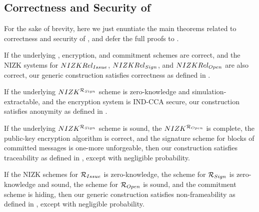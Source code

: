 \subsection{Correctness and Security of \GSACGen}
\label{ssec:security-gsac}

For the sake of brevity, here we just enuntiate the main theorems related to
correctness and security of \GSAC, and defer the full proofs to
.

\begin{theorem}
  \label{thm:correctness-gsac}
  If the underlying \SBCM, encryption, and commitment schemes are correct, and
  the NIZK systems for $NIZKRel_{Issue}$, $NIZKRel_{Sign}$, and $NIZKRel_{Open}$
  are also correct, our generic construction \GSACGen
  satisfies correctness as defined in .
\end{theorem}

\begin{theorem}
  \label{thm:anonymity-gsac}
  If the underlying $NIZK^{\mathcal{R}_{Sign}}$ scheme is zero-knowledge and
  simulation-extractable, and the encryption system is IND-CCA secure,
  our \GSACGen construction satisfies anonymity as defined in
  .
\end{theorem}

\begin{theorem}
  \label{thm:trace-gsac}
  If the underlying $NIZK^{\mathcal{R}_{Sign}}$ scheme is sound, the
  $NIZK^{\mathcal{R}_{Open}}$ is  complete, the public-key encryption algorithm
  is correct, and the signature scheme for blocks of committed messages is
  one-more unforgeable, then our \GSACGen construction satisfies traceability as
  defined in , except with negligible
  probability.
\end{theorem}

\begin{theorem}
  \label{thm:frame-gsac}
  If the NIZK schemes for $\mathcal{R}_{Issue}$ is zero-knowledge, the scheme for
  $\mathcal{R}_{Sign}$ is zero-knowledge and sound, the scheme for $\mathcal{R}_{Open}$ is
  sound, and the commitment scheme \C is hiding, then our generic \GSACGen
  construction satisfies non-frameability as defined in ,
  except with negligible probability.
\end{theorem}

